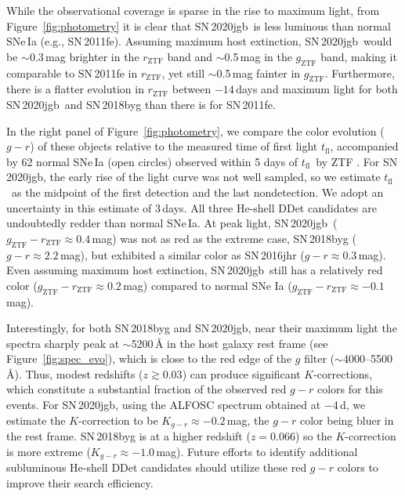 \documentclass[twocolumn]{aastex631}
\newcommand{\sn}{SN\,2020jgb}
\newcommand{\tfl}{$t_\mathrm{fl}$}
\begin{document}
While the observational coverage is sparse in the rise to maximum light, from Figure~\ref{fig:photometry} it is clear that \sn\ is less luminous than normal SNe\,Ia (e.g., SN\,2011fe). Assuming maximum host extinction, \sn\ would be $\sim$0.3\,mag brighter in the $r_\mathrm{ZTF}$ band and $\sim$0.5\,mag in the $g_\mathrm{ZTF}$ band, making it comparable to SN\,2011fe in $r_\mathrm{ZTF}$, yet still $\sim$0.5\,mag fainter in $g_\mathrm{ZTF}$. Furthermore, there is a flatter evolution in $r_\mathrm{ZTF}$ between $-14$\,days and maximum light for both \sn\ and SN\,2018byg than there is for SN\,2011fe.  

In the right panel of Figure~\ref{fig:photometry}, we compare the color evolution ($g-r$) of these objects relative to the measured time of first light \tfl, accompanied by 62 normal SNe\,Ia (open circles) observed within 5 days of \tfl\ by ZTF \citep[from][]{Bulla2020}. For \sn, the early rise of the light curve was not well sampled, so we estimate \tfl\ as the midpoint of the first detection and the last nondetection. We adopt an uncertainty in this estimate of 3\,days. All three He-shell DDet candidates are undoubtedly redder than normal SNe\,Ia. At peak light, \sn\ ($g_\mathrm{ZTF}-r_\mathrm{ZTF}\approx0.4$\,mag) was not as red as the extreme case, SN\,2018byg ($g-r\approx2.2$\,mag), but exhibited a similar color as SN\,2016jhr ($g-r\approx0.3$\,mag). Even assuming maximum host extinction, \sn\ still has a relatively red color ($g_\mathrm{ZTF}-r_\mathrm{ZTF}\approx0.2$\,mag) compared to normal SNe Ia ($g_\mathrm{ZTF}-r_\mathrm{ZTF}\approx-0.1$\,mag).

Interestingly, for both SN\,2018byg and \sn, near their maximum light the spectra sharply peak at $\sim$5200\,\r{A} in the host galaxy rest frame (see Figure~\ref{fig:spec_evo}), which is close to the red edge of the $g$ filter ($\sim$4000--5500\,\r{A}). Thus, modest redshifts ($z\gtrsim0.03$) can produce significant $K$-corrections, which constitute a substantial fraction of the observed red $g-r$ colors for this events. For \sn, using the ALFOSC spectrum obtained at $-$4\,d, we estimate the $K$-correction to be $K_{g-r}\approx -0.2$\,mag, the $g-r$ color being bluer in the rest frame. SN\,2018byg is at a higher redshift ($z=0.066$) so the $K$-correction is more extreme ($K_{g-r}\approx-1.0$\,mag). Future efforts to identify additional subluminous He-shell DDet candidates should utilize these red $g-r$ colors to improve their search efficiency.
\end{document}

